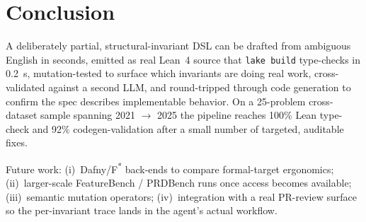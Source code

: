 \documentclass{article}
\begin{document}
\section{Conclusion}

A deliberately partial, structural-invariant DSL can be drafted from ambiguous English in seconds, emitted as real Lean~4 source that \texttt{lake build} type-checks in 0.2~s, mutation-tested to surface which invariants are doing real work, cross-validated against a second LLM, and round-tripped through code generation to confirm the spec describes implementable behavior. On a 25-problem cross-dataset sample spanning 2021 $\to$ 2025 the pipeline reaches 100\% Lean type-check and 92\% codegen-validation after a small number of targeted, auditable fixes.

Future work: (i)~Dafny/F\textsuperscript{*} back-ends to compare formal-target ergonomics; (ii)~larger-scale FeatureBench / PRDBench runs once access becomes available; (iii)~semantic mutation operators; (iv)~integration with a real PR-review surface so the per-invariant trace lands in the agent's actual workflow.



\end{document}

